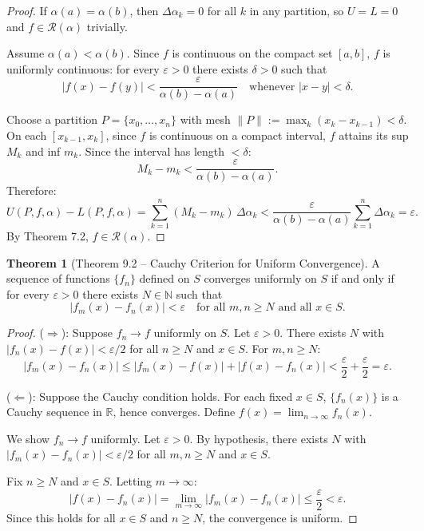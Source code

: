 \documentclass[12pt,a4paper]{article}
\theoremstyle{definition}
\newtheorem{theorem}{Theorem}[section]
\newcommand{\R}{\mathbb{R}}
\newcommand{\N}{\mathbb{N}}
\newcommand{\eps}{\varepsilon}
\begin{document}
\begin{proof}
If $\alpha(a) = \alpha(b)$, then $\Delta\alpha_k = 0$ for all $k$ in any partition, so $U = L = 0$ and $f \in \mathcal{R}(\alpha)$ trivially.

Assume $\alpha(a) < \alpha(b)$. Since $f$ is continuous on the compact set $[a,b]$, $f$ is uniformly continuous: for every $\eps > 0$ there exists $\delta > 0$ such that
\[
    |f(x) - f(y)| < \frac{\eps}{\alpha(b) - \alpha(a)} \quad \text{whenever } |x - y| < \delta.
\]

Choose a partition $P = \{x_0, \ldots, x_n\}$ with mesh $\|P\| := \max_k(x_k - x_{k-1}) < \delta$. On each $[x_{k-1}, x_k]$, since $f$ is continuous on a compact interval, $f$ attains its sup $M_k$ and inf $m_k$. Since the interval has length $< \delta$:
\[
    M_k - m_k < \frac{\eps}{\alpha(b) - \alpha(a)}.
\]
Therefore:
\[
    U(P,f,\alpha) - L(P,f,\alpha) = \sum_{k=1}^n (M_k - m_k)\,\Delta\alpha_k < \frac{\eps}{\alpha(b)-\alpha(a)} \sum_{k=1}^n \Delta\alpha_k = \eps.
\]
By Theorem 7.2, $f \in \mathcal{R}(\alpha)$.
\end{proof}

\begin{theorem}[Theorem 9.2 -- Cauchy Criterion for Uniform Convergence]
A sequence of functions $\{f_n\}$ defined on $S$ converges uniformly on $S$ if and only if for every $\eps > 0$ there exists $N \in \N$ such that
\[
    |f_m(x) - f_n(x)| < \eps \quad \text{for all } m, n \geq N \text{ and all } x \in S.
\]
\end{theorem}

\begin{proof}
($\Rightarrow$): Suppose $f_n \to f$ uniformly on $S$. Let $\eps > 0$. There exists $N$ with $|f_n(x) - f(x)| < \eps/2$ for all $n \geq N$ and $x \in S$. For $m, n \geq N$:
\[
    |f_m(x) - f_n(x)| \leq |f_m(x) - f(x)| + |f(x) - f_n(x)| < \frac{\eps}{2} + \frac{\eps}{2} = \eps.
\]

($\Leftarrow$): Suppose the Cauchy condition holds. For each fixed $x \in S$, $\{f_n(x)\}$ is a Cauchy sequence in $\R$, hence converges. Define $f(x) = \lim_{n\to\infty} f_n(x)$.

We show $f_n \to f$ uniformly. Let $\eps > 0$. By hypothesis, there exists $N$ with $|f_m(x) - f_n(x)| < \eps/2$ for all $m, n \geq N$ and $x \in S$.

Fix $n \geq N$ and $x \in S$. Letting $m \to \infty$:
\[
    |f(x) - f_n(x)| = \lim_{m \to \infty} |f_m(x) - f_n(x)| \leq \frac{\eps}{2} < \eps.
\]
Since this holds for all $x \in S$ and $n \geq N$, the convergence is uniform.
\end{proof}
\end{document}
